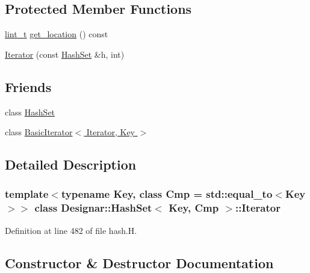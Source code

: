 \subsection*{Protected Member Functions}
\begin{DoxyCompactItemize}
\item 
\hyperlink{namespace_designar_a9d113d66a39e82b73727c72cd3a52f73}{lint\+\_\+t} \hyperlink{class_designar_1_1_hash_set_1_1_iterator_a8616bd592e20ebadab10de5c78a56eda}{get\+\_\+location} () const
\item 
\hyperlink{class_designar_1_1_hash_set_1_1_iterator_ae349523995246685946ec860e2705221}{Iterator} (const \hyperlink{class_designar_1_1_hash_set}{Hash\+Set} \&h, int)
\end{DoxyCompactItemize}
\subsection*{Friends}
\begin{DoxyCompactItemize}
\item 
class \hyperlink{class_designar_1_1_hash_set_1_1_iterator_ac5220f06200dc3b0d55d050a940f17b9}{Hash\+Set}
\item 
class \hyperlink{class_designar_1_1_hash_set_1_1_iterator_a0b375a570add16b09037ce1773f0ddbb}{Basic\+Iterator$<$ Iterator, Key $>$}
\end{DoxyCompactItemize}


\subsection{Detailed Description}
\subsubsection*{template$<$typename Key, class Cmp = std\+::equal\+\_\+to$<$\+Key$>$$>$\newline
class Designar\+::\+Hash\+Set$<$ Key, Cmp $>$\+::\+Iterator}



Definition at line 482 of file hash.\+H.



\subsection{Constructor \& Destructor Documentation}
\mbox{\label{class_designar_1_1_hash_set_1_1_iterator_ae349523995246685946ec860e2705221}} 
